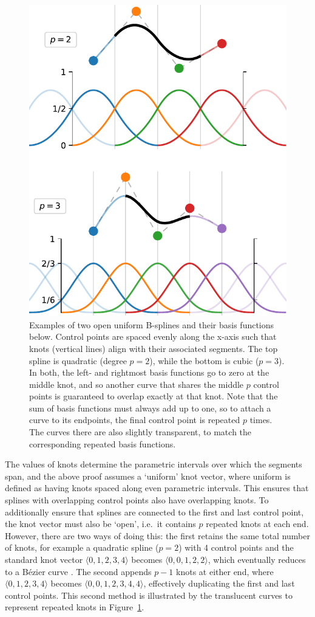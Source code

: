 \begin{figure}
  \centering
  \includegraphics[width=.85\linewidth]{power/basis.pdf}
  \caption[B-spline basis functions]{Examples of two open uniform B-splines and their basis functions below. Control points are spaced evenly along the x-axis such that knots (vertical lines) align with their associated segments. The top spline is quadratic (degree $p=2$), while the bottom is cubic ($p=3$). In both, the left- and rightmost basis functions go to zero at the middle knot, and so another curve that shares the middle $p$ control points is guaranteed to overlap exactly at that knot. Note that the sum of basis functions must always add up to one, so to attach a curve to its endpoints, the final control point is repeated $p$ times. The curves there are also slightly transparent, to match the corresponding repeated basis functions.}
  \label{fig:basis}
\end{figure}

The values of knots determine the parametric intervals over which the segments span, and the above proof assumes a `uniform' knot vector, where uniform is defined as having knots spaced along even parametric intervals. This ensures that splines with overlapping control points also have overlapping knots.
To additionally ensure that splines are connected to the first and last control point, the knot vector must also be `open', i.e.\ it contains $p$ repeated knots at each end.
However, there are two ways of doing this: the first retains the same total number of knots, for example a quadratic spline ($p=2$) with 4 control points and the standard knot vector $\langle0,1,2,3,4\rangle$ becomes $\langle0,0,1,2,2\rangle$, which eventually reduces to a B\'ezier curve \citep{Sederberg2005}. The second appends $p-1$ knots at either end, where $\langle0,1,2,3,4\rangle$ becomes $\langle0,0,1,2,3,4,4\rangle$, effectively duplicating the first and last control points.
This second method is illustrated by the translucent curves to represent repeated knots in Figure~\ref{fig:basis}.

